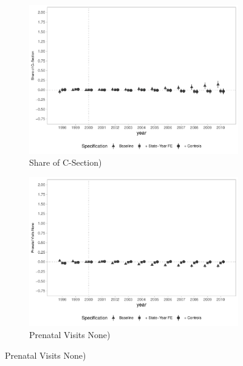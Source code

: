 \begin{figure}[h]
    \begin{center}
    \caption{Causal Effects on Access to Health Services}\label{fig:access3}
    \begin{subfigure}{0.48\textwidth}
        \caption{\scriptsize Share of C-Section)}\label{fig:access3_a}
        \centering
        \includegraphics[width=\textwidth]{plots/birth/birth_c_sections_dist_ec29_baseline_dist_ec29_baseline_full.pdf}
    \end{subfigure}
    \begin{subfigure}{0.48\textwidth}
        \centering
        \caption{\scriptsize Prenatal Visits None)}\label{fig:iaccess3_b}
        \includegraphics[width=\textwidth]{plots/birth/birth_prenat_0_dist_ec29_baseline_dist_ec29_baseline_full.pdf}

\end{subfigure}
\end{center}
\end{figure}
